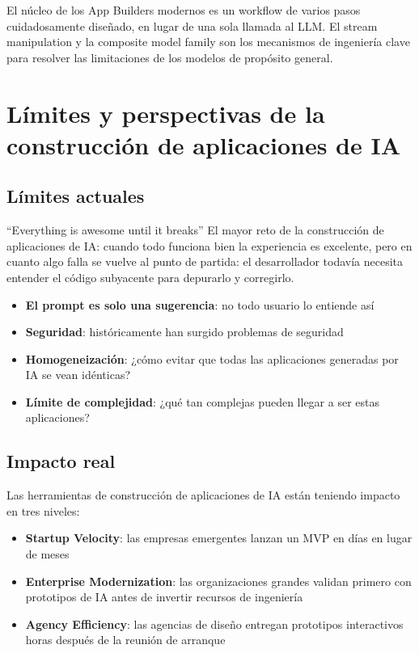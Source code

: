 \documentclass[a4paper]{article}
\begin{document}
El núcleo de los App Builders modernos es un workflow de varios pasos cuidadosamente diseñado, en lugar de una sola llamada al LLM. El stream manipulation y la composite model family son los mecanismos de ingeniería clave para resolver las limitaciones de los modelos de propósito general.
\section{Límites y perspectivas de la construcción de aplicaciones de IA}

\subsection{Límites actuales}

\begin{warningbox}{``Everything is awesome until it breaks''}
El mayor reto de la construcción de aplicaciones de IA: cuando todo funciona bien la experiencia es excelente, pero en cuanto algo falla se vuelve al punto de partida: el desarrollador todavía necesita entender el código subyacente para depurarlo y corregirlo.
\end{warningbox}

\begin{itemize}
    \item \textbf{El prompt es solo una sugerencia}: no todo usuario lo entiende así
    \item \textbf{Seguridad}: históricamente han surgido problemas de seguridad
    \item \textbf{Homogeneización}: ¿cómo evitar que todas las aplicaciones generadas por IA se vean idénticas?
    \item \textbf{Límite de complejidad}: ¿qué tan complejas pueden llegar a ser estas aplicaciones?
\end{itemize}

\subsection{Impacto real}

Las herramientas de construcción de aplicaciones de IA están teniendo impacto en tres niveles:

\begin{itemize}
    \item \textbf{Startup Velocity}: las empresas emergentes lanzan un MVP en días en lugar de meses
    \item \textbf{Enterprise Modernization}: las organizaciones grandes validan primero con prototipos de IA antes de invertir recursos de ingeniería
    \item \textbf{Agency Efficiency}: las agencias de diseño entregan prototipos interactivos horas después de la reunión de arranque
\end{itemize}
\end{document}
